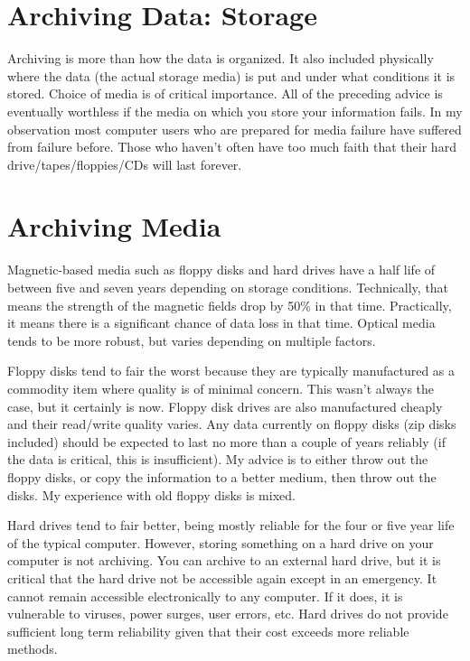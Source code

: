 \documentclass[a4paper]{article}
\begin{document}
\section{Archiving Data: Storage%
  \label{archiving-data-storage}%
}

Archiving is more than how the data is organized. It also included
physically where the data (the actual storage media) is put and under
what conditions it is stored. Choice of media is of critical importance.
All of the preceding advice is eventually worthless if the media on
which you store your information fails. In my observation most computer
users who are prepared for media failure have suffered from failure
before. Those who haven't often have too much faith that their hard
drive/tapes/floppies/CDs will last forever.


\section{Archiving Media%
  \label{archiving-media}%
}

Magnetic-based media such as floppy disks and hard drives have a half
life of between five and seven years depending on storage conditions.
Technically, that means the strength of the magnetic fields drop by 50\%
in that time. Practically, it means there is a significant chance of
data loss in that time. Optical media tends to be more robust, but
varies depending on multiple factors.

Floppy disks tend to fair the worst because they are typically
manufactured as a commodity item where quality is of minimal concern.
This wasn't always the case, but it certainly is now. Floppy disk drives
are also manufactured cheaply and their read/write quality varies. Any
data currently on floppy disks (zip disks included) should be expected
to last no more than a couple of years reliably (if the data is
critical, this is insufficient). My advice is to either throw out the
floppy disks, or copy the information to a better medium, then throw out
the disks. My experience with old floppy disks is mixed.

Hard drives tend to fair better, being mostly reliable for the four or
five year life of the typical computer. However, storing something on a
hard drive on your computer is not archiving. You can archive to an
external hard drive, but it is critical that the hard drive not be
accessible again except in an emergency. It cannot remain accessible
electronically to any computer. If it does, it is vulnerable to viruses,
power surges, user errors, etc. Hard drives do not provide sufficient
long term reliability given that their cost exceeds more reliable
methods.
\end{document}
